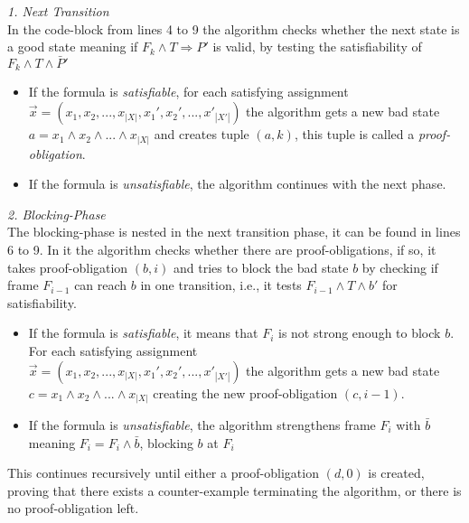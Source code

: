 \documentclass[11pt, a4paper, BCOR=10mm, ngerman]{scrbook}
\begin{document}
\textsl{1. Next Transition} \\ In the code-block from lines 4 to 9 the algorithm checks whether the next state is a good state meaning if $F_k \land T \Rightarrow P'$ is valid, by testing the satisfiability of $F_k \land T \land \bar P'$ 
\begin{itemize}
\item If the formula is \textsl{satisfiable}, for each satisfying assignment \\ $\vec{x} = (x_1, x_2, ..., x_{|X|}, x_1', x_2', ..., x'_{|X'|})$ the algorithm gets a new bad state \\ $a = x_1 \land x_2 \land ... \land x_{|X|}$ and creates tuple $(a, k)$, this tuple is called a \textsl{proof-obligation}.

\item If the formula is \textsl{unsatisfiable}, the algorithm continues with the next phase. \\
\end{itemize}


\textsl{2. Blocking-Phase} \\ The blocking-phase is nested in the next transition phase, it can be found in lines 6 to 9. In it the algorithm checks whether there are proof-obligations, if so, 
it takes proof-obligation $(b, i)$ and tries to block the bad state $b$ by checking if frame $F_{i-1}$ can reach $b$ in one transition, i.e., it tests $F_{i-1} \land T \land b'$ for satisfiability.

\begin{itemize}
\item If the formula is \textsl{satisfiable}, it means that $F_{i}$ is not strong enough to block $b$. For each satisfying assignment \\ $\vec{x} = (x_1, x_2, ..., x_{|X|}, x_1', x_2', ..., x'_{|X'|})$ the algorithm gets a new bad state \\ $c = x_1 \land x_2 \land ... \land x_{|X|}$ creating the new proof-obligation $(c, i-1)$.

\item If the formula is \textsl{unsatisfiable}, the algorithm strengthens frame $F_{i}$ with $\bar b$ meaning $F_i = F_i \land \bar b$, blocking $b$ at $F_{i}$ 

\end{itemize}

This continues recursively until either a proof-obligation $(d, 0)$ is created, proving that there exists a counter-example terminating the algorithm, or
there is no proof-obligation left. \\
\end{document}
